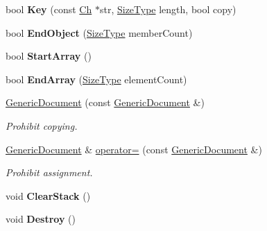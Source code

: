 \begin{DoxyCompactItemize}
\item 
bool {\bfseries Key} (const \hyperlink{class_generic_value_ade0e0ce64ccd5d852da57a35e720bafb}{Ch} $\ast$str, \hyperlink{rapidjson_8h_a5ed6e6e67250fadbd041127e6386dcb5}{Size\+Type} length, bool copy)\hypertarget{class_generic_document_a600d0950baabbcab11197cacb1459c7a}{}\label{class_generic_document_a600d0950baabbcab11197cacb1459c7a}

\item 
bool {\bfseries End\+Object} (\hyperlink{rapidjson_8h_a5ed6e6e67250fadbd041127e6386dcb5}{Size\+Type} member\+Count)\hypertarget{class_generic_document_a42f2df68f9c9d8b88a15b609716867d9}{}\label{class_generic_document_a42f2df68f9c9d8b88a15b609716867d9}

\item 
bool {\bfseries Start\+Array} ()\hypertarget{class_generic_document_ae12c513c61745ae731a47b1ca33db063}{}\label{class_generic_document_ae12c513c61745ae731a47b1ca33db063}

\item 
bool {\bfseries End\+Array} (\hyperlink{rapidjson_8h_a5ed6e6e67250fadbd041127e6386dcb5}{Size\+Type} element\+Count)\hypertarget{class_generic_document_a14097c833bed1a9c7be064ea619c887f}{}\label{class_generic_document_a14097c833bed1a9c7be064ea619c887f}

\item 
\hyperlink{class_generic_document_a58dd6c300949aeb9627de7f9e34796db}{Generic\+Document} (const \hyperlink{class_generic_document}{Generic\+Document} \&)\hypertarget{class_generic_document_a58dd6c300949aeb9627de7f9e34796db}{}\label{class_generic_document_a58dd6c300949aeb9627de7f9e34796db}

\begin{DoxyCompactList}\small\item\em Prohibit copying. \end{DoxyCompactList}\item 
\hyperlink{class_generic_document}{Generic\+Document} \& \hyperlink{class_generic_document_ae31cd36a3b677d697d0a3bed68edf3c3}{operator=} (const \hyperlink{class_generic_document}{Generic\+Document} \&)\hypertarget{class_generic_document_ae31cd36a3b677d697d0a3bed68edf3c3}{}\label{class_generic_document_ae31cd36a3b677d697d0a3bed68edf3c3}

\begin{DoxyCompactList}\small\item\em Prohibit assignment. \end{DoxyCompactList}\item 
void {\bfseries Clear\+Stack} ()\hypertarget{class_generic_document_aa6f040219ed1d4cdd48f7ed9353942a4}{}\label{class_generic_document_aa6f040219ed1d4cdd48f7ed9353942a4}

\item 
void {\bfseries Destroy} ()\hypertarget{class_generic_document_ad72f36087f5129ad4b5321cf8418c923}{}\label{class_generic_document_ad72f36087f5129ad4b5321cf8418c923}

\end{DoxyCompactItemize}
